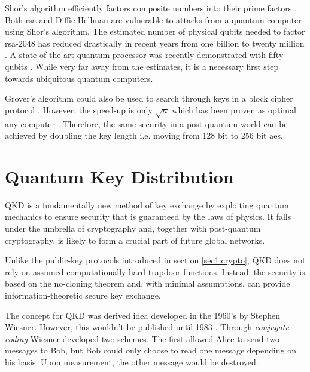 
Shor's algorithm efficiently factors composite numbers into their prime factors \cite{shor1994}. Both \ac{rsa} and Diffie-Hellman are vulnerable to attacks from a quantum computer using Shor's algorithm. The estimated number of physical qubits needed to factor \ac{rsa}-2048 has reduced drastically in recent years from one billion \cite{mosca2018, fowler2012} to twenty million \cite{gidney2019}. A state-of-the-art quantum processor was recently demonstrated with fifty qubits \cite{arute2019quantum}. While very far away from the estimates, it is a necessary first step towards ubiquitous quantum computers.

Grover's algorithm could also be used to search through keys in a block cipher protocol \cite{grover1996fast}. However, the speed-up is only $\sqrt{n}$ which has been proven as optimal any computer \cite{Bennent1997}. Therefore, the same security in a post-quantum world can be achieved by doubling the key length i.e. moving from 128 bit to 256 bit \ac{aes}.

\section{Quantum Key Distribution}

\Acf{QKD} is a fundamentally new method of key exchange by exploiting quantum mechanics to ensure security that is guaranteed by the laws of physics. It falls under the umbrella of  cryptography and, together with post-quantum cryptography, is likely to form a crucial part of future global networks.

Unlike the public-key protocols introduced in section \ref{sec1:crypto}, \ac{QKD} does not rely on assumed computationally hard trapdoor functions. Instead, the security is based on the no-cloning theorem and, with minimal assumptions, can provide information-theoretic secure key exchange.

The concept for \ac{QKD} was derived idea developed in the 1960's by Stephen Wiesner. However, this wouldn't be published until 1983 \cite{quantum_money}. Through \emph{conjugate coding} Wiesner developed two schemes. The first allowed Alice to send two messages to Bob, but Bob could only choose to read one message depending on his basis. Upon measurement, the other message would be destroyed.


